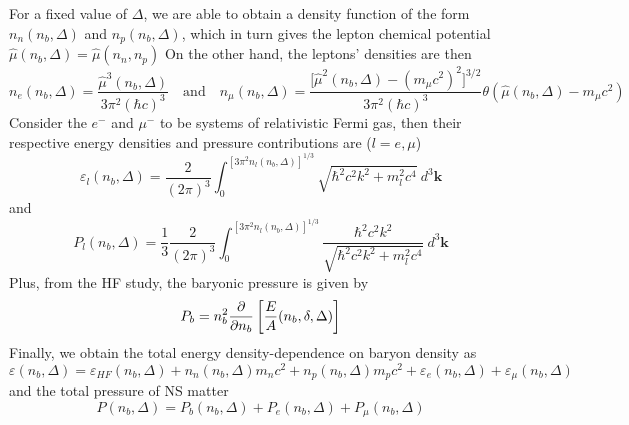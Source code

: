 For a fixed value of $\Delta$, we are able to obtain a density function of the form $n_n (n_b, \Delta)$ and $n_p (n_b, \Delta)$, which in turn gives the lepton chemical potential $\hat{\mu}(n_b,\Delta) = \hat{\mu}(n_n,n_p)$ On the other hand, the leptons' densities are then \citep{loan2011equation}
\begin{equation}
        n_e(n_b,\Delta) = \frac{ \hat{\mu}^3(n_b,\Delta)}{ 3\pi^2 (\hbar c)^3} \quad\text{and}\quad n_\mu(n_b,\Delta) = \frac{ \Big[\hat{\mu}^2(n_b,\Delta) - (m_\mu c^2)^2\Big]^{3/2}}{ 3\pi^2 (\hbar c)^3} \theta(\hat{\mu}(n_b,\Delta)-m_\mu c^2)
\end{equation} 
Consider the $e^-$ and $\mu^-$ to be systems of relativistic Fermi gas, then their respective energy densities and pressure contributions are ($l=e,\mu$) \citep{moustakidis2009equation}
\begin{equation}
        \varepsilon_l(n_b,\Delta) = \frac{ 2}{ (2\pi)^3} \int_{{0}}^{{[3\pi^2n_l(n_b,\Delta)]^{1/3}}} {\sqrt{\hbar^2 c^2 k^2 + m_l^2 c^4}} \: d^3{\mathbf{k}}
\end{equation} 
and
\begin{equation}
        P_l(n_b,\Delta) = \frac{ 1}{ 3} \frac{ 2}{ (2\pi)^3} \int_{{0}}^{{[3\pi^2 n_l(n_b,\Delta)]^{1/3}}} { \frac{ \hbar^2 c^2 k^2}{ \sqrt{\hbar^2 c^2 k^2 + m_l^2 c^4}} } \: d^3{\mathbf{k}}
\end{equation} 
Plus, from the \gls{HF} study, the baryonic pressure is given by
\begin{equation}
    P_b = n_b^2 \pdv{}{n_b} \left[ \frac{E}{A}(n_b,\delta,\Delta) \right]
\end{equation}
Finally, we obtain the total energy density-dependence on baryon density as 
\begin{equation}
        \varepsilon(n_b,\Delta) = \varepsilon_{HF}(n_b,\Delta) + n_n(n_b,\Delta)m_n c^2 + n_p(n_b,\Delta)m_p c^2 + \varepsilon_e(n_b,\Delta) + \varepsilon_\mu(n_b,\Delta)
\end{equation}
and the total pressure of \gls{NS} matter
\begin{equation}
        P(n_b,\Delta) = P_b(n_b,\Delta) + P_e(n_b,\Delta) + P_\mu(n_b,\Delta)
\end{equation}
